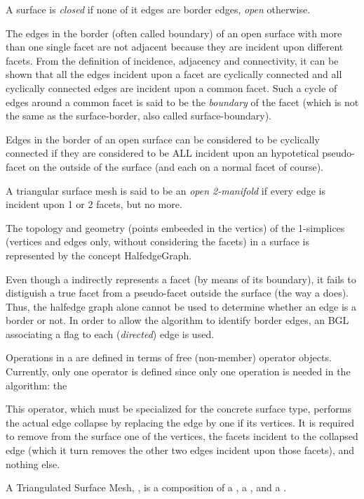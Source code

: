 A surface is {\em closed} if none of it edges are border edges, {\em open} otherwise.

The edges in the border (often called boundary) of an open surface with more than one single facet are not adjacent because they are incident upon different facets. From the definition of incidence, adjacency and connectivity, it can be shown that all the edges incident upon a facet are cyclically connected and all cyclically connected edges are incident upon a common facet. Such a cycle of edges around a common facet is said to be the {\em boundary} of the facet (which is not the same as the surface-border, also called surface-boundary).

Edges in the border of an open surface can be considered to be cyclically connected if they are considered to be ALL  incident upon an hypotetical pseudo-facet on the outside of the surface (and each on a normal facet of course).

A triangular surface mesh is said to be an {\em open 2-manifold} if every edge is incident upon 1 or 2 facets, but no more.

The topology and geometry (points embeeded in the vertics) of the 1-simplices (vertices and edges only, without considering the facets) in a surface is represented by the concept {HalfedgeGraph}.

Even though a  indirectly represents a facet (by means of its boundary), it fails to distiguish a true facet from a pseudo-facet outside the surface (the way a  does). Thus, the halfedge graph alone cannot be used to determine whether an edge is a border or not. In order to allow the algorithm to identify border edges, an BGL  associating a  flag to each ({\em directed}) edge is used.

Operations in a  are defined in terms of free (non-member) operator objects. Currently, only one operator is defined since only one operation is needed in the algorithm: the 
 
This operator, which must be specialized for the concrete surface type, performs the actual edge collapse by replacing the edge by one if its vertices. It is required to remove from the surface one of the vertices, the facets incident to the collapsed edge (which it turn removes the other two edges incident upon those facets), and nothing else.

A Triangulated Surface Mesh, , is a composition of a , a , and a
.

